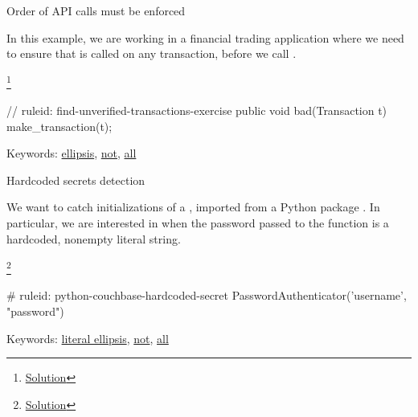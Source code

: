 \documentclass[aspectratio=169, handout]{beamer}
\newenvironment{exercisePage}[1]{
  \begin{minipage}[t][0.4in][t]{\textwidth}
    \Large \term{Exercise:} #1
  \end{minipage}
  \begin{minipage}[t][2.6in][t]{\textwidth}
}{
  \end{minipage}
}
\newcommand\blfootnote[1]{
    \begingroup
    \renewcommand\thefootnote{}\footnote{#1}
    \addtocounter{footnote}{-1}
    \endgroup
}
\newcommand\solutionLink[1]{
  \blfootnote{\color{blue}\href{#1}{Solution}}
}
\newcommand\ellipsisLink[1][]{{\color{blue}\href{https://semgrep.dev/docs/writing-rules/pattern-syntax\#ellipsis-operator}{ellipsis}}}
\newcommand\patternNotLink[1][]{{\color{blue}\href{https://semgrep.dev/docs/writing-rules/rule-syntax\#pattern-not}{not}}}
\newcommand\patternAllLink[1][]{{\color{blue}\href{https://semgrep.dev/docs/writing-rules/rule-syntax\#patterns}{all}}}
\newcommand\literalEllipsisLink[1][]{{\color{blue}\href{https://semgrep.dev/docs/writing-rules/pattern-syntax\#strings}{literal ellipsis}}}
\begin{document}
\begin{frame}[fragile]
  \begin{exercisePage}{Order of API calls must be enforced}

  In this example, we are working in a financial trading application where we need to
  ensure that  is called on any transaction, before we call
  .
  \solutionLink{https://semgrep.dev/playground/r/4bURwNG/semgrep.find-unverified-transactions-exercise-solution}

  \vspace{\fill}

  \begin{codeblock}[language=java]
    // ruleid: find-unverified-transactions-exercise
    public void bad(Transaction t) {
      make_transaction(t);
    }
  \end{codeblock}

  \vspace{\fill}

  Keywords: \ellipsisLink, \patternNotLink, \patternAllLink
  \end{exercisePage}
\end{frame}


\begin{frame}[fragile]
  \begin{exercisePage}{Hardcoded secrets detection}

  We want to catch initializations of a , imported
  from a Python package . In particular, we are interested in
  when the password passed to the function is a hardcoded, nonempty literal string.
  \solutionLink{https://semgrep.dev/playground/r/4bURwNG/semgrep.find-unverified-transactions-exercise-solution}


  \vspace{\fill}


  \vspace{\fill}

  \begin{pythoncodeblock}
    # ruleid: python-couchbase-hardcoded-secret
    PasswordAuthenticator('username', "password")
  \end{pythoncodeblock}

  \vspace{\fill}

  Keywords: \literalEllipsisLink, \patternNotLink, \patternAllLink
  \end{exercisePage}
\end{frame}
\end{document}
